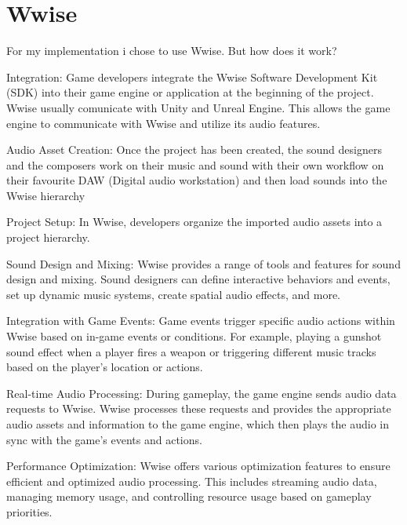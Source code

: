 \section{Wwise}
For my implementation i chose to use Wwise. But how does it work?
	
\begin{compactitem}
	\item Integration: Game developers integrate the Wwise Software Development Kit (SDK) into their game engine or application at the beginning of the project. Wwise usually comunicate with Unity and Unreal Engine. This allows the game engine to communicate with Wwise and utilize its audio features.
		
	\item Audio Asset Creation: Once the project has been created, the sound designers and the composers work on their music and sound with their own workflow on their favourite DAW (Digital audio workstation) and then load sounds into the Wwise hierarchy
		
	\item Project Setup: In Wwise, developers organize the imported audio assets into a project hierarchy.
		
	\item Sound Design and Mixing: Wwise provides a range of tools and features for sound design and mixing. Sound designers can define interactive behaviors and events, set up dynamic music systems, create spatial audio effects, and more.
		
	\item Integration with Game Events: Game events trigger specific audio actions within Wwise based on in-game events or conditions. For example, playing a gunshot sound effect when a player fires a weapon or triggering different music tracks based on the player's location or actions.
		
	\item Real-time Audio Processing: During gameplay, the game engine sends audio data requests to Wwise. Wwise processes these requests and provides the appropriate audio assets and information to the game engine, which then plays the audio in sync with the game's events and actions.
		
	\item Performance Optimization: Wwise offers various optimization features to ensure efficient and optimized audio processing. This includes streaming audio data, managing memory usage, and controlling resource usage based on gameplay priorities.
\end{compactitem}

